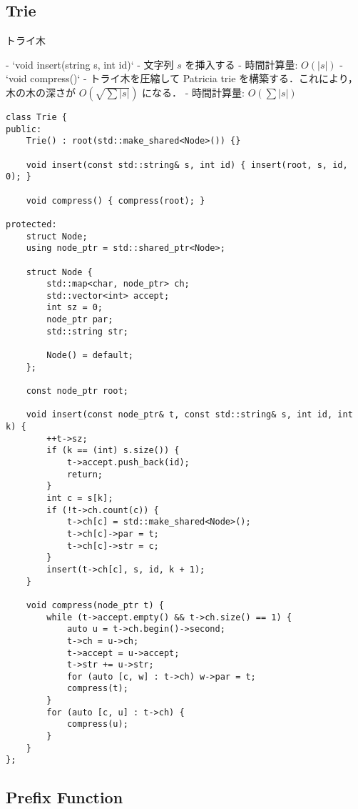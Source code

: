 \subsection{Trie}

\begin{small}
\begin{markdown}
トライ木

- `void insert(string s, int id)`
    - 文字列 $s$ を挿入する
    - 時間計算量: $O(\vert s\vert)$
- `void compress()`
    - トライ木を圧縮して Patricia trie を構築する．これにより，木の木の深さが $O(\sqrt{\sum \vert s \vert})$ になる．
    - 時間計算量: $O(\sum \vert s\vert)$
\end{markdown}
\end{small}

\begin{lstlisting}
class Trie {
public:
    Trie() : root(std::make_shared<Node>()) {}

    void insert(const std::string& s, int id) { insert(root, s, id, 0); }

    void compress() { compress(root); }

protected:
    struct Node;
    using node_ptr = std::shared_ptr<Node>;

    struct Node {
        std::map<char, node_ptr> ch;
        std::vector<int> accept;
        int sz = 0;
        node_ptr par;
        std::string str;

        Node() = default;
    };

    const node_ptr root;

    void insert(const node_ptr& t, const std::string& s, int id, int k) {
        ++t->sz;
        if (k == (int) s.size()) {
            t->accept.push_back(id);
            return;
        }
        int c = s[k];
        if (!t->ch.count(c)) {
            t->ch[c] = std::make_shared<Node>();
            t->ch[c]->par = t;
            t->ch[c]->str = c;
        }
        insert(t->ch[c], s, id, k + 1);
    }

    void compress(node_ptr t) {
        while (t->accept.empty() && t->ch.size() == 1) {
            auto u = t->ch.begin()->second;
            t->ch = u->ch;
            t->accept = u->accept;
            t->str += u->str;
            for (auto [c, w] : t->ch) w->par = t;
            compress(t);
        }
        for (auto [c, u] : t->ch) {
            compress(u);
        }
    }
};
\end{lstlisting}

\subsection{Prefix Function}

